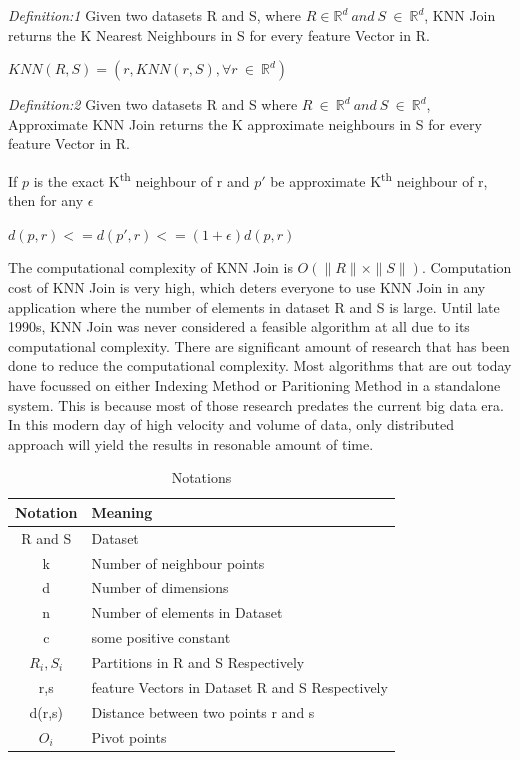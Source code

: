 \documentclass[conference]{IEEEtran}
\begin{document}
\emph{Definition:1} Given two datasets R and S, where $R \in \mathbb{R}^d\ and\ S\ \in\ \mathbb{R}^d$, KNN Join returns the K
Nearest Neighbours in S for every feature Vector in R.

\bigskip
     $KNN(R,S) = {(r, KNN(r,S), \forall r\ \in\ \mathbb{R}^d)}$
\bigskip

\emph{Definition:2} Given two datasets R and S where $R\ \in\
\mathbb{R}^d\ and\ S\ \in\ \mathbb{R}^d$, Approximate KNN Join returns the K
approximate neighbours in S for every feature Vector in R.

\medskip

If $p$ is the exact K\textsuperscript{th} neighbour of r and $p'$ be approximate
K\textsuperscript{th} neighbour of r, then for any $\epsilon$

\bigskip

$d(p,r) <= d(p',r) <= (1+\epsilon) d(p,r)$

\bigskip

The computational complexity of KNN Join is
$O(\|R\| \times \|S\|)$. Computation cost of KNN Join is very high, which
deters everyone to use KNN Join in any application where
the number of elements in dataset R and S is large. Until late 1990s, KNN Join was
never considered a feasible algorithm at all due to its computational
complexity. There are significant amount of research that has been done to reduce the
computational complexity. Most algorithms that are out today have focussed
on either Indexing Method or Paritioning Method in a standalone system. This is because most of those research predates the
current big data era. In this modern day of high velocity and volume of data,
only distributed approach will yield the results in resonable amount of time.

\bigskip

\begin{table}[!t]
\caption{Notations}
\label{notations}
\centering
\begin{tabular}{|c|l|}
\hline
Notation & Meaning \\
\hline
R and S & Dataset\\

k & Number of neighbour points \\

d & Number of dimensions \\

n & Number of elements in Dataset \\

c & some positive constant \\

$R_i, S_i$ & Partitions in R and S Respectively \\

r,s & feature Vectors in Dataset R and S Respectively \\

d(r,s) & Distance between two points r and s \\

$O_i$ & Pivot points \\

\hline
\end{tabular}
\end{table}
\end{document}

